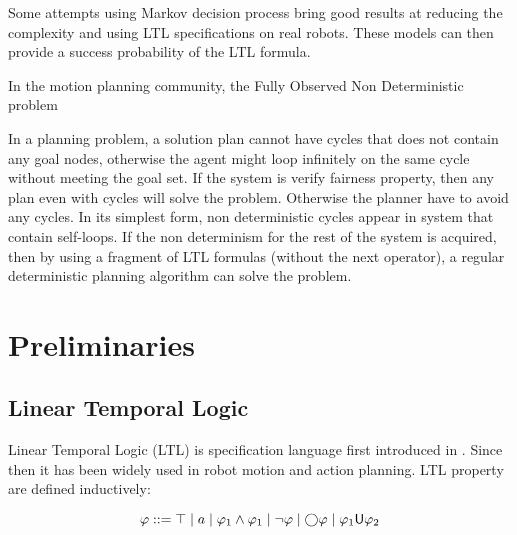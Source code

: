 Some attempts using Markov decision process bring good results at reducing the complexity and using LTL specifications on real robots. These models can then provide a success probability of the LTL formula. 

In the motion planning community, the Fully Observed Non Deterministic problem  

In a planning problem, a solution plan cannot have cycles that does not contain any goal nodes, otherwise the agent might loop infinitely on the same cycle without meeting the goal set. If the system is verify fairness property, then any plan even with cycles will solve the problem. Otherwise the planner have to avoid any cycles.
In its simplest form, non deterministic cycles appear in system that contain self-loops. If the non determinism for the rest of the system is acquired, then by using a fragment of LTL formulas (without the next operator), a regular deterministic planning algorithm can solve the problem.




\section{Preliminaries}

\subsection{Linear Temporal Logic}
Linear Temporal Logic (LTL) is specification language first introduced in \cite{pnueli1977temporal}. Since then it has been widely used in robot motion and action planning.
LTL property are defined inductively:

$$ \varphi ::= 
\top \mid 
a \mid 
\varphi_1 \land \varphi_1 \mid
\lnot \varphi \mid
\bigcirc \varphi \mid
\varphi_1 \mathsf{U} \varphi_2$$

